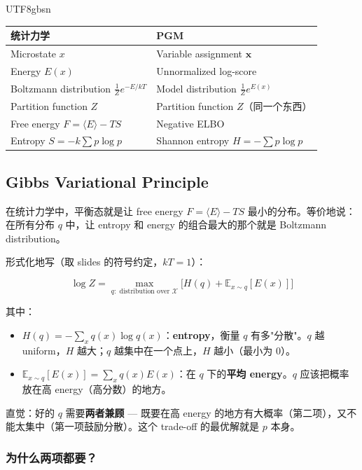 \documentclass[11pt]{article}
\begin{document}
\begin{CJK}{UTF8}{gbsn}
\begin{center}
\begin{tabular}{l|l}
  \textbf{统计力学} & \textbf{PGM} \\
  \hline
  Microstate $x$ & Variable assignment $\mathbf{x}$ \\
  Energy $E(x)$ & Unnormalized log-score \\
  Boltzmann distribution $\frac{1}{Z}e^{-E/kT}$ & Model distribution $\frac{1}{Z}e^{E(x)}$ \\
  Partition function $Z$ & Partition function $Z$（同一个东西） \\
  Free energy $F = \langle E \rangle - TS$ & Negative ELBO \\
  Entropy $S = -k\sum p\log p$ & Shannon entropy $H = -\sum p\log p$ \\
\end{tabular}
\end{center}

\subsection{Gibbs Variational Principle}

在统计力学中，平衡态就是让 free energy $F = \langle E \rangle - TS$ 最小的分布。等价地说：在所有分布 $q$ 中，让 entropy 和 energy 的组合最大的那个就是 Boltzmann distribution。

形式化地写（取 slides 的符号约定，$kT=1$）：

\[
  \boxed{\log Z = \max_{q:\text{ distribution over } \mathcal{X}} \Big[ H(q) + \mathbb{E}_{x\sim q}[E(x)] \Big]}
\]

其中：
\begin{itemize}
  \item $H(q) = -\sum_x q(x)\log q(x)$：\textbf{entropy}，衡量 $q$ 有多"分散"。$q$ 越 uniform，$H$ 越大；$q$ 越集中在一个点上，$H$ 越小（最小为 0）。
  \item $\mathbb{E}_{x\sim q}[E(x)] = \sum_x q(x) E(x)$：在 $q$ 下的\textbf{平均 energy}。$q$ 应该把概率放在高 energy（高分数）的地方。
\end{itemize}

直觉：好的 $q$ 需要\textbf{两者兼顾} --- 既要在高 energy 的地方有大概率（第二项），又不能太集中（第一项鼓励分散）。这个 trade-off 的最优解就是 $p$ 本身。

\subsubsection{为什么两项都要？}


\end{CJK}
\end{document}
